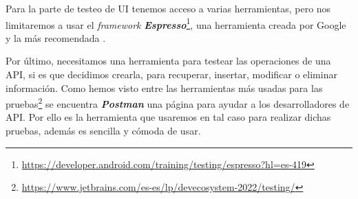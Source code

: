 Para la parte de testeo de UI tenemos acceso a varias herramientas, pero nos limitaremos a usar el 
\textit{framework} 
\textbf{\textit{Espresso}}\footnote{\url{https://developer.android.com/training/testing/espresso?hl=es-419}}, una herramienta creada por Google y la más recomendada \cite{UITest}.

Por último, necesitamos una herramienta para testear las operaciones de una API, si es que decidimos 
crearla, para  recuperar, insertar, modificar o eliminar información. Como hemos visto entre las 
herramientas más usadas para las pruebas\footnote{\url{https://www.jetbrains.com/es-es/lp/devecosystem-2022/testing/}} se encuentra \textit{\textbf{Postman}} una página para ayudar a los desarrolladores de 
API. Por ello es la herramienta que usaremos en tal caso para realizar dichas pruebas, además es 
sencilla y cómoda de usar.